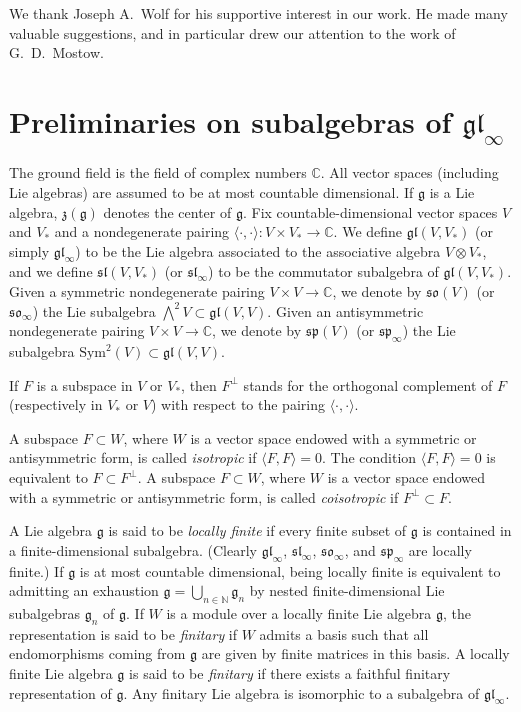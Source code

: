 \documentclass{article}
\newcommand {\C} {\mathbb{C}}
\def\N{\mathbb N}
\def\gl{\mathfrak {gl}}
\def\g{\mathfrak {g}}
\def\sl{\mathfrak{sl}}
\def\so{\mathfrak{so}}
\def\sp{\mathfrak{sp}}
\def\z{\mathfrak {z}}
\newcommand{\Sym}{\mathrm{Sym}}
\begin{document}
We thank Joseph A.\ Wolf for his supportive interest in our work.  He made many valuable suggestions, and in particular drew our attention to the work \cite{Mostow} of G.\ D.\ Mostow.


\section{Preliminaries on subalgebras of $\gl_\infty$} \label{preliminaries}


The ground field is the field of complex numbers $\C$. All vector spaces (including Lie algebras) are assumed to be at most countable dimensional.  If $\g$ is a Lie algebra, $\z(\g)$ denotes the center of $\g$.  Fix countable-dimensional vector spaces $V$ and $V_*$ and a nondegenerate pairing $\langle \cdot , \cdot \rangle \colon V \times V_*  \rightarrow \C$.  We define $\gl(V,V_*)$ (or simply $\gl_\infty$) to be the Lie algebra associated to the associative algebra $V \otimes V_*$, and we define $\sl(V,V_*)$ (or $\sl_\infty$) to be the commutator subalgebra of $\gl(V,V_*)$.  Given a symmetric nondegenerate pairing $V \times V \rightarrow \C$, we denote by $\so(V)$ (or $\so_\infty$) the Lie subalgebra $\bigwedge^2 V \subset \gl(V,V)$.  Given an antisymmetric nondegenerate pairing $V \times V \rightarrow \C$, we denote by $\sp(V)$ (or $\sp_\infty$) the Lie subalgebra $\Sym^2 (V) \subset \gl(V,V)$.

If $F$ is a subspace in $V$ or $V_*$, then $F^\perp$ stands for the orthogonal complement of $F$ (respectively in $V_*$ or $V$) with respect to the pairing $\langle \cdot , \cdot \rangle$. 

A subspace $F \subset W$, where $W$ is a vector space endowed with a symmetric or antisymmetric form, is called \emph{isotropic} if $\langle F , F \rangle = 0$.  The condition $\langle F , F \rangle = 0$ is equivalent to $F \subset F^\perp$.  A subspace $F \subset W$, where $W$ is a vector space endowed with a symmetric or antisymmetric form, is called \emph{coisotropic} if $F^\perp \subset F$.

A Lie algebra $\g$ is said to be \emph{locally finite} if every finite subset of $\g$ is contained in a finite-dimensional subalgebra.  (Clearly $\gl_\infty$, $\sl_\infty$, $\so_\infty$, and $\sp_\infty$ are locally finite.) If $\g$ is at most countable dimensional, being locally finite is equivalent to admitting an exhaustion $\g=\bigcup_{n\in\N}\g_n$ by nested finite-dimensional Lie subalgebras $\g_n$ of $\g$. If $W$ is a module over a locally finite Lie algebra $\g$, the representation is said to be \emph{finitary} if $W$ admits a basis such that all endomorphisms coming from $\g$ are given by finite matrices in this basis.  A locally finite Lie algebra $\g$ is said to be \emph{finitary} if there exists a faithful finitary representation of $\g$.  Any finitary Lie algebra is isomorphic to a subalgebra of $\gl_\infty$.
\end{document}
